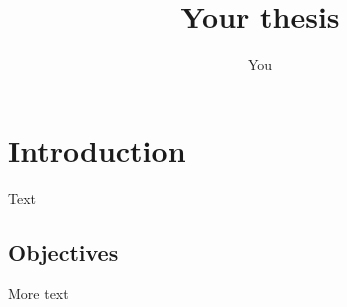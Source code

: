 \documentclass{scrbook}
\title{Your thesis}
\author{You}
\begin{document}
\frontmatter
\maketitle
\tableofcontents
\mainmatter

\chapter{Introduction}
Text \cite{Mittelbach:2004}
\section{Objectives}
More text



\end{document}
